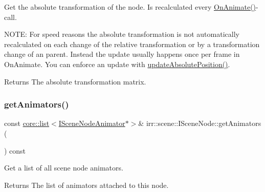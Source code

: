 Get the absolute transformation of the node. Is recalculated every \hyperlink{classirr_1_1scene_1_1ISceneNode_afc1dcb5cb19116d0c7aa3d4ebdf04cc5}{On\+Animate()}-\/call. 

N\+O\+TE\+: For speed reasons the absolute transformation is not automatically recalculated on each change of the relative transformation or by a transformation change of an parent. Instead the update usually happens once per frame in On\+Animate. You can enforce an update with \hyperlink{classirr_1_1scene_1_1ISceneNode_aeb6e0dc034bb2101600ce87acbcf0f6e}{update\+Absolute\+Position()}. \begin{DoxyReturn}{Returns}
The absolute transformation matrix. 
\end{DoxyReturn}
\mbox{\label{classirr_1_1scene_1_1ISceneNode_a454fc115d9afa89623c55deba8a4add1}} 
\subsubsection{\texorpdfstring{get\+Animators()}{getAnimators()}\hspace{0.1cm}{\footnotesize\ttfamily [1/2]}}
{\footnotesize\ttfamily const \hyperlink{classirr_1_1core_1_1list}{core\+::list}$<$\hyperlink{classirr_1_1scene_1_1ISceneNodeAnimator}{I\+Scene\+Node\+Animator}$\ast$$>$\& irr\+::scene\+::\+I\+Scene\+Node\+::get\+Animators (\begin{DoxyParamCaption}{ }\end{DoxyParamCaption}) const\hspace{0.3cm}{\ttfamily [inline]}}



Get a list of all scene node animators. 

\begin{DoxyReturn}{Returns}
The list of animators attached to this node. 
\end{DoxyReturn}
\mbox{\label{classirr_1_1scene_1_1ISceneNode_a454fc115d9afa89623c55deba8a4add1}} 
